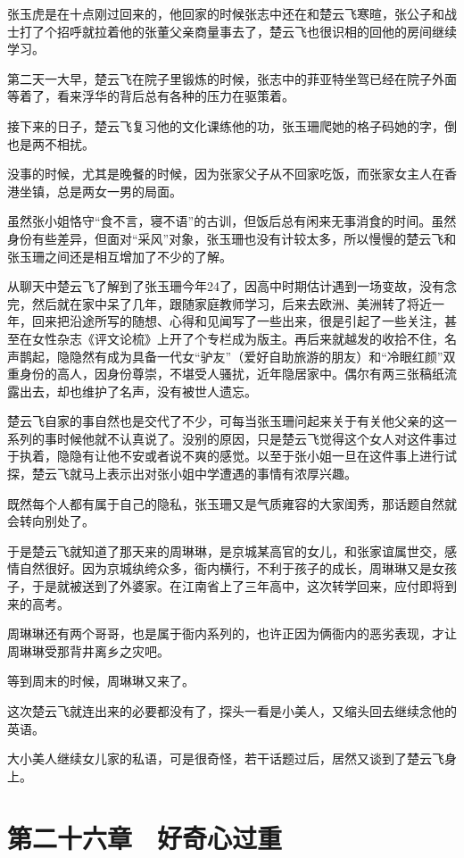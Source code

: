 张玉虎是在十点刚过回来的，他回家的时候张志中还在和楚云飞寒暄，张公子和战士打了个招呼就拉着他的张董父亲商量事去了，楚云飞也很识相的回他的房间继续学习。

第二天一大早，楚云飞在院子里锻炼的时候，张志中的菲亚特坐驾已经在院子外面等着了，看来浮华的背后总有各种的压力在驱策着。

接下来的日子，楚云飞复习他的文化课练他的功，张玉珊爬她的格子码她的字，倒也是两不相扰。

没事的时候，尤其是晚餐的时候，因为张家父子从不回家吃饭，而张家女主人在香港坐镇，总是两女一男的局面。

虽然张小姐恪守“食不言，寝不语”的古训，但饭后总有闲来无事消食的时间。虽然身份有些差异，但面对“采风”对象，张玉珊也没有计较太多，所以慢慢的楚云飞和张玉珊之间还是相互增加了不少的了解。

从聊天中楚云飞了解到了张玉珊今年24了，因高中时期估计遇到一场变故，没有念完，然后就在家中呆了几年，跟随家庭教师学习，后来去欧洲、美洲转了将近一年，回来把沿途所写的随想、心得和见闻写了一些出来，很是引起了一些关注，甚至在女性杂志《评文论梳》上开了个专栏成为版主。再后来就越发的收拾不住，名声鹊起，隐隐然有成为具备一代女“驴友”（爱好自助旅游的朋友）和“冷眼红颜”双重身份的高人，因身份尊崇，不堪受人骚扰，近年隐居家中。偶尔有两三张稿纸流露出去，却也维护了名声，没有被世人遗忘。

楚云飞自家的事自然也是交代了不少，可每当张玉珊问起来关于有关他父亲的这一系列的事时候他就不认真说了。没别的原因，只是楚云飞觉得这个女人对这件事过于执着，隐隐有让他不安或者说不爽的感觉。以至于张小姐一旦在这件事上进行试探，楚云飞就马上表示出对张小姐中学遭遇的事情有浓厚兴趣。

既然每个人都有属于自己的隐私，张玉珊又是气质雍容的大家闺秀，那话题自然就会转向别处了。

于是楚云飞就知道了那天来的周琳琳，是京城某高官的女儿，和张家谊属世交，感情自然很好。因为京城纨绔众多，衙内横行，不利于孩子的成长，周琳琳又是女孩子，于是就被送到了外婆家。在江南省上了三年高中，这次转学回来，应付即将到来的高考。

周琳琳还有两个哥哥，也是属于衙内系列的，也许正因为俩衙内的恶劣表现，才让周琳琳受那背井离乡之灾吧。

等到周末的时候，周琳琳又来了。

这次楚云飞就连出来的必要都没有了，探头一看是小美人，又缩头回去继续念他的英语。

大小美人继续女儿家的私语，可是很奇怪，若干话题过后，居然又谈到了楚云飞身上。

\section{第二十六章　好奇心过重}

